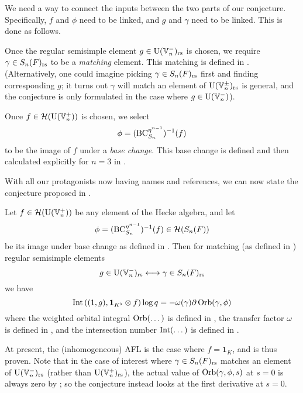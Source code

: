 \begin{itemize}
  \ii We need a way to connect the inputs between the two parts of our conjecture.
  Specifically, $f$ and $\phi$ need to be linked, and $g$ and $\gamma$ need to be linked.
  This is done as follows.
  \begin{itemize}
    \ii Once the regular semisimple element $g \in \operatorname{U}(\mathbb V_n^-)_{\mathrm{rs}}$ is chosen,
    we require $\gamma \in S_n(F)_{\mathrm{rs}}$ to be a \emph{matching} element.
    This matching is defined in .
    (Alternatively, one could imagine picking $\gamma \in S_n(F)_{\mathrm{rs}}$ first
    and finding corresponding $g$;
    it turns out $\gamma$ will match an element of $\operatorname{U}(\mathbb V_n^\pm)_{\mathrm{rs}}$ is general,
    and the conjecture is only formulated in the case where $g \in \operatorname{U}(\mathbb V_n^-)$).

    \ii Once $f \in \mathcal H(\operatorname{U}(\mathbb V_n^+))$ is chosen, we select
    \[ \phi = (\operatorname{BC}_{S_n}^{\eta^{n-1}})^{-1}(f) \]
    to be the image of $f$ under a \emph{base change}.
    This base change is defined and then calculated explicitly for $n = 3$ in .
  \end{itemize}
\end{itemize}
With all our protagonists now having names and references,
we can now state the conjecture proposed in \cite{ref:AFLspherical}.

\begin{conjecture}
  \label{conj:inhomog_spherical}
  Let $f \in \mathcal H(\operatorname{U}(\mathbb V_n^+))$ be any element of the Hecke algebra, and let
  \[ \phi = (\operatorname{BC}_{S_n}^{\eta^{n-1}})^{-1}(f) \in \mathcal H(S_n(F)) \]
  be its image under base change as defined in .
  Then for matching (as defined in ) regular semisimple elements
  \[ g \in \operatorname{U}(\mathbb V_n^-)_{\mathrm{rs}} \longleftrightarrow \gamma \in S_n(F)_{\mathrm{rs}} \]
  we have
  \begin{equation}
    \operatorname{Int}\left( (1,g), \mathbf{1}_{K^\flat} \otimes f \right) \log q
    = -\omega(\gamma) \partial \operatorname{Orb}(\gamma, \phi)
    \label{eq:inhomog}
  \end{equation}
  where the weighted orbital integral $\operatorname{Orb}(\dots)$ is defined in ,
  the transfer factor $\omega$ is defined in ,
  and the intersection number $\operatorname{Int}(\dots)$ is defined in .
\end{conjecture}

At present, the (inhomogeneous) AFL is the case where $f = \mathbf{1}_K$,
and is thus proven.
Note that in the case of interest where $\gamma \in S_n(F)_{\mathrm{rs}}$
matches an element of $\operatorname{U}(\mathbb V_n^-)_{\mathrm{rs}}$ (rather than $\operatorname{U}(\mathbb V_n^+)_{\mathrm{rs}}$),
the actual value of $\operatorname{Orb}(\gamma, \phi, s)$ at $s = 0$ is always zero
by ;
so the conjecture instead looks at the first derivative at $s = 0$.

